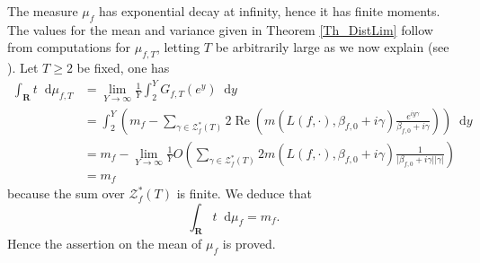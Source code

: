 \documentclass[a4paper,10pt]{amsart}
\theoremstyle{plain}
\theoremstyle{definition}
\begin{document}
The measure $\mu_{f}$ has exponential decay at infinity, hence it has finite moments.
The values for the mean and variance given in Theorem \ref{Th_DistLim} follow from computations for $\mu_{f,T}$, letting $T$ be arbitrarily large as we now explain (see \cite{FioEC}).
Let $T\geq2$ be fixed, one has
\begin{align*}
\int_{\mathbf{R}}t{\mathop{}\!\mathrm{d}}\mu_{f,T} &=\lim_{Y\rightarrow\infty} \frac{1}{Y} \int_{2}^{Y} G_{f,T}(e^{y}){\mathop{}\!\mathrm{d}} y \\
&=  \int_{2}^{Y} \left(m_{f}  -\sum_{ \gamma\in\mathcal{Z}_{f}^{*}(T)}2\operatorname{Re}\left(m(L(f,\cdot),\beta_{f,0} + i\gamma)\frac{e^{iy\gamma}}{\beta_{f,0} + i\gamma}\right)\right) {\mathop{}\!\mathrm{d}} y \\
&= m_{f} - \lim_{Y\rightarrow\infty} \frac{1}{Y}  O\left(\sum_{ \gamma\in\mathcal{Z}_{f}^{*}(T)}2m(L(f,\cdot),\beta_{f,0} + i\gamma)\frac{1}{\lvert\beta_{f,0} + i\gamma\rvert \lvert\gamma\rvert} \right) \\
&= m_{f}
\end{align*}
because the sum over $\mathcal{Z}_{f}^{*}(T)$ is finite.
We deduce that 
\begin{equation*}
\int_{\mathbf{R}}t{\mathop{}\!\mathrm{d}}\mu_{f} = m_{f}.
\end{equation*}
Hence the assertion on the mean of $\mu_{f}$ is proved.
\end{document}

